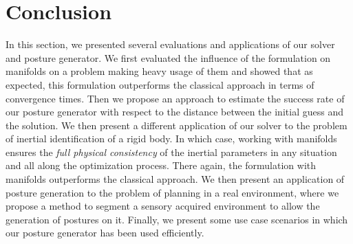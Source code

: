 \section{Conclusion}
\label{sec:conclusion_chap_6}

In this section, we presented several evaluations and applications of our solver and posture generator.
We first evaluated the influence of the formulation on manifolds on a problem making heavy usage of them and showed that as expected, this formulation outperforms the classical approach in terms of convergence times.
Then we propose an approach to estimate the success rate of our posture generator with respect to the distance between the initial guess and the solution.
We then present a different application of our solver to the problem of inertial identification of a rigid body.
In which case, working with manifolds ensures the \emph{full physical consistency} of the inertial parameters in any situation and all along the optimization process.
There again, the formulation with manifolds outperforms the classical approach.
We then present an application of posture generation to the problem of planning in a real environment, where we propose a method to segment a sensory acquired environment to allow the generation of postures on it.
Finally, we present some use case scenarios in which our posture generator has been used efficiently.
